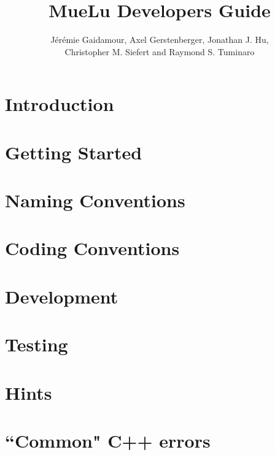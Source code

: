 \documentclass{article}
\title{MueLu Developers Guide}
\author{J\'er\'emie Gaidamour, Axel Gerstenberger, Jonathan J. Hu,\\
        Christopher M. Siefert and  Raymond S. Tuminaro}
\begin{document}

\maketitle

\newpage
\tableofcontents
\newpage

\begin{abstract}

\end{abstract}
\newpage

\pagestyle{myheadings} \thispagestyle{plain} 

\section{Introduction}\label{sec:introduction}


\section{Getting Started}\label{sec:getting started}


\section{Naming Conventions}\label{sec:naming conventions}


\section{Coding Conventions}\label{sec:coding conventions}


\section{Development}\label{sec:development}


\section{Testing}\label{sec:testing}


\section{Hints}\label{sec:hints}


\section{``Common" C++ errors}\label{sec:common errors}



\newpage
 
\end{document}
